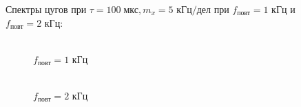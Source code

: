 \documentclass[a4paper, 12pt]{article}
\begin{document}
Спектры цугов при $\tau = 100 \; \text{мкс}, m_x = 5 \text{ кГц/дел}$ при $f_{\text{повт}} = 1 \text{ кГц}$  и $f_{\text{повт}} = 2 \text{ кГц}$:\\

\begin{figure}[h]
	\begin{minipage}[h]{0.5\linewidth}
		 \\$f_{\text{повт}}= 1$ кГц
	\end{minipage}
	\begin{minipage}[h]{0.5\linewidth}
		 \\$f_{\text{повт}}= 2$ кГц
	\end{minipage}
\end{figure}
\end{document}
